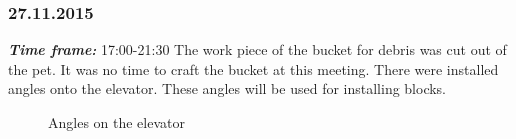 \subsubsection{27.11.2015}
\textit{\textbf{Time frame:}} 17:00-21:30 \newline
The work piece of the bucket for debris was cut out of the pet. It was no time to craft the bucket at this meeting.
There were installed angles onto the elevator. These angles will be used for installing blocks.

  	\begin{figure}[H]
  		\begin{minipage}[h]{1\linewidth}
  			\caption{Angles on the elevator}
  		\end{minipage}
  	\end{figure}
  	
